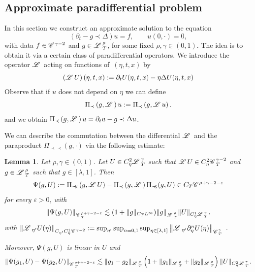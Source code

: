 \documentclass[11pt,reqno]{amsart}
\newcommand{\assign}{:=}
\newcommand{\cdummy}{\cdot}
\newcommand{\precprec}{\prec\!\!\!\prec}
\newtheorem{lemma}[theorem]{Lemma}
\newcommand{\CC}{\mathscr{C} \hspace{.1em}}
\newcommand{\LL}{\mathscr{L} \hspace{.2em}}
\begin{document}
\subsection{Approximate paradifferential problem}\label{s:approx-paradiff}

In this section we construct an approximate solution to the equation
\begin{equation}
  (\partial_t - g \prec \Delta) u = f, \qquad u (0, \cdot) = 0,
  \label{e:paradiff}
\end{equation}
with data $f \in \CC^{\gamma - 2}$ and $g \in \LL^{\rho}_T$, for some fixed
$\rho, \gamma \in (0, 1)$. The idea is to obtain it via a certain class of
paradifferential operators. We introduce the operator $\LL$ acting on
functions of~$(\eta, t, x)$ by
\begin{equation}
  \left( \LL U \right) (\eta, t, x) \assign \partial_t U (\eta, t, x) - \eta
  \Delta U (\eta, t, x) \label{e:def-Loper}
\end{equation}
Observe that if $u$ does not depend on $\eta$ we can define
\begin{equation}
  \Pi_{\prec} \left( g, \LL \right) u \assign \Pi_{\prec} \left( g, \LL u
  \right) . \label{e:paradiff-oper}
\end{equation}
and we obtain $\Pi_{\prec} \left( g, \LL \right) u = \partial_t u - g \prec
\Delta u$.

We can describe the commutation between the differential $\LL$ and the
paraproduct $\Pi_{\precprec} (g, \cdummy)$ via the following estimate:

\begin{lemma}
  \label{l:def-psi}Let $\rho, \gamma \in (0, 1)$. Let $U \in C_{\eta}^2
  \LL^{\gamma}_T$ such that $\LL U \in C^2_{\eta} \CC^{\gamma - 2}_T$ and $g
  \in \LL^{\rho}_T$ such that $g \in [\lambda, 1]$. Then
  \[ \Psi (g, U) \assign \Pi_{\precprec} \left( g, \LL U \right) - \Pi_{\prec}
     \left( g, \LL \right) \Pi_{\precprec} (g, U) \in C_T \CC^{\rho + \gamma -
     2 - \varepsilon} \]
  for every $\varepsilon > 0$, with
  \begin{equation}
    \| \Psi (g, U) \|_{\CC_T^{\rho + \gamma - 2 - \varepsilon}} \lesssim (1 +
    \| g \|_{C_T L^{\infty}}) \| g \|_{\LL^{\rho}_T}^{} \| U \|_{C_{\eta}^1
    \LL^{\gamma}_{_T}}  \label{e:psi-est} .
  \end{equation}
  with $\left\| \LL_{\eta'} U (\eta) \right\|_{C_{\eta'} C^1_{\eta}
  \CC^{\gamma - 2}} : = \sup_{\eta'} \sup_{n = 0, 1} \sup_{\eta \in [\lambda,
  1]} \left\| \LL_{\eta'} \partial_{\eta}^n U (\eta)
  \right\|_{\CC_T^{\gamma}}$ .
  
  Moreover, $\Psi (g, U)$ is linear in $U$ and
  \[ \| \Psi (g_1, U) - \Psi (g_2, U) \|_{\CC_T^{\rho + \gamma - 2 -
     \varepsilon}} \lesssim \| g_1 - g_2 \|_{\LL^{\rho}_T} \left( 1 + \| g_1
     \|_{\LL^{\rho}_T} + \| g_2 \|_{\LL^{\rho}_T} \right) \| U \|_{C_{\eta}^2
     \LL^{\gamma}_{_T}} . \]
\end{lemma}
\end{document}
